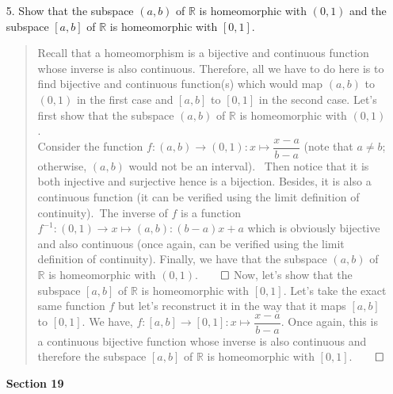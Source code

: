 \documentclass[12pt, a4paper]{article}
\newcommand{\reals}{\mathbb{R}} %
\newcommand{\rarr}{\rightarrow}
\begin{document}
\begin{itemize}
\item[5.]
Show that the subspace $(a, b)$ of $\reals$ is homeomorphic with $(0, 1)$
and the subspace $[a, b]$ of $\reals$ is homeomorphic with $[0, 1]$.
\begin{quote}
Recall that a homeomorphism is a bijective and continuous function whose inverse is also continuous.
Therefore, all we have to do here is to find bijective and continuous function(s) which would map $(a, b)$ to $(0, 1)$
in the first case and $[a, b]$ to $[0, 1]$ in the second case.
\newline
\newline
Let's first show that the subspace $(a, b)$ of $\reals$ is homeomorphic with $(0, 1)$.\\
\vspace{0.1cm}
Consider the function $f : (a, b) \rarr (0, 1) : x \mapsto \dfrac{x - a}{b - a}$ (note that $a \neq b$; otherwise, $(a, b)$ would not be an interval).\
\vspace{0.1cm}
Then notice that it is both injective and surjective hence is a bijection.
Besides, it is also a continuous function (it can be verified using the limit definition of continuity).\
The inverse of $f$ is a function $f^{-1} : (0, 1) \rarr x \mapsto (a, b) : (b - a)x + a$ which
is obviously bijective and also continuous (once again, can be verified using the limit definition of continuity).
Finally, we have that the subspace $(a, b)$ of $\reals$ is homeomorphic with $(0, 1)$.$\qed$
\newline
\newline
Now, let's show that the subspace $[a, b]$ of $\reals$ is homeomorphic with $[0, 1]$.
Let's take the exact same function $f$ but let's reconstruct it in the way that it maps $[a, b]$
to $[0, 1]$. We have, $f : [a, b] \rarr [0, 1] : x \mapsto \dfrac{x - a}{b - a}$.
Once again, this is a continuous bijective function whose inverse is also continuous
and therefore the subspace $[a, b]$ of $\reals$ is homeomorphic with $[0, 1]$.$\qed$
\end{quote}

\item[]
\item[]
\item[]
{\large \textbf{Section 19}}
\vspace{0.3cm}


\end{itemize}
\end{document}
